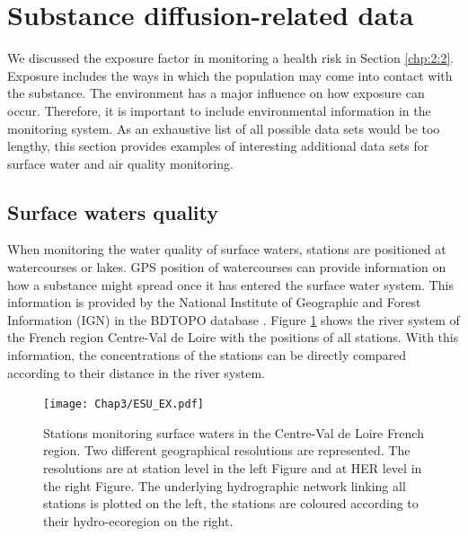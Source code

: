 \section{Substance diffusion-related data}\label{chp:2:4}

We discussed the exposure factor in monitoring a health risk in Section \ref{chp:2:2}. Exposure includes the ways in which the population may come into contact with the substance. The environment has a major influence on how exposure can occur. Therefore, it is important to include environmental information in the monitoring system. As an exhaustive list of all possible data sets would be too lengthy, this section provides examples of interesting additional data sets for surface water and air quality monitoring.

\subsection{Surface waters quality}

When monitoring the water quality of surface waters, stations are positioned at watercourses or lakes. GPS position of watercourses can provide information on how a substance might spread once it has entered the surface water system. This information is provided by the National Institute of Geographic and Forest Information (IGN) in the BDTOPO database \citep{BDTOPO}. Figure \ref{fig:esu_ex} shows the river system of the French region Centre-Val de Loire with the positions of all stations. With this information, the concentrations of the stations can be directly compared according to their distance in the river system. 

\begin{figure}[ht]
    \centering
    \texttt{[image: Chap3/ESU\_EX.pdf]}
    \caption{Stations monitoring surface waters in the Centre-Val de Loire French region. Two different geographical resolutions are represented. The resolutions are at station level in the left Figure and at HER level in the right Figure. The underlying hydrographic network linking all stations is plotted on the left, the stations are coloured according to their hydro-ecoregion on the right.}
    \label{fig:esu_ex}
\end{figure}

